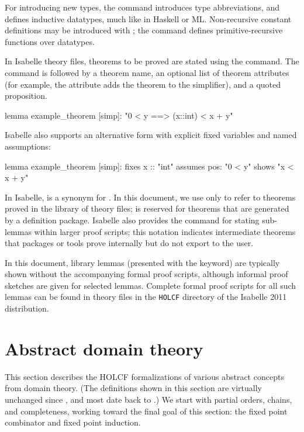 For introducing new types, the  command introduces type abbreviations, and  defines inductive datatypes, much like in Haskell or ML. Non-recursive constant definitions may be introduced with ; the  command defines primitive-recursive functions over datatypes.

In Isabelle theory files, theorems to be proved are stated using the  command. The command is followed by a theorem name, an optional list of theorem attributes (for example, the \isa{[simp]} attribute adds the theorem to the simplifier), and a quoted proposition.

\begin{isacode}
lemma example_theorem [simp]:
  "0 < y ==> (x::int) < x + y"
\end{isacode}

\noindent
Isabelle also supports an alternative form with explicit fixed variables and named assumptions:

\begin{isacode}
lemma example_theorem [simp]:
  fixes x :: "int" assumes pos: "0 < y" shows "x < x + y"
\end{isacode}

In Isabelle,  is a synonym for . In this document, we use  only to refer to theorems proved in the  library of theory files;  is reserved for theorems that are generated by a definition package. Isabelle also provides the  command for stating sub-lemmas within larger proof scripts; this notation indicates intermediate theorems that packages or tools prove internally but do not export to the user.

In this document,  library lemmas (presented with the  keyword) are typically shown without the accompanying formal proof scripts, although informal proof sketches are given for selected lemmas. Complete formal proof scripts for all such lemmas can be found in theory files in the \texttt{HOLCF} directory of the Isabelle 2011 distribution.


\section{Abstract domain theory}
\label{sec:holcf-abstract}

This section describes the HOLCF formalizations of various abstract concepts from domain theory. (The  definitions shown in this section are virtually unchanged since , and most date back to .) We start with partial orders, chains, and completeness, working toward the final goal of this section: the fixed point combinator and fixed point induction.

